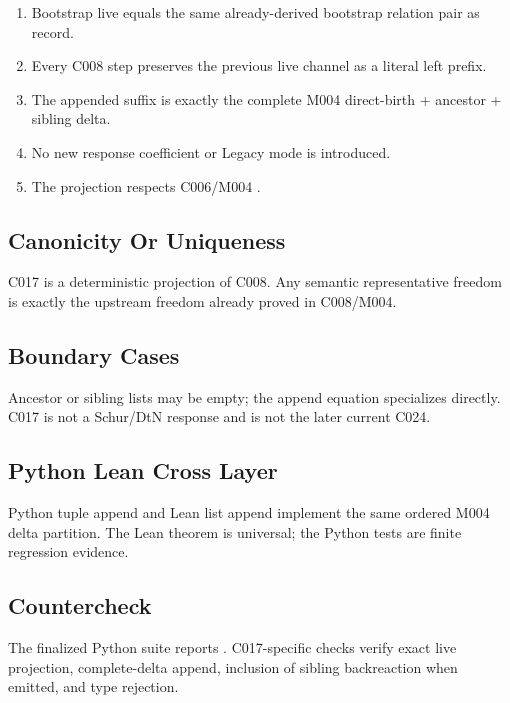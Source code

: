\begin{enumerate}
\def\labelenumi{\arabic{enumi}.}
\tightlist
\item
  Bootstrap live equals the same already-derived bootstrap relation pair
  as record.
\item
  Every C008 step preserves the previous live channel as a literal left
  prefix.
\item
  The appended suffix is exactly the complete M004 direct-birth +
  ancestor + sibling delta.
\item
  No new response coefficient or Legacy mode is introduced.
\item
  The projection respects C006/M004 \texttt{\protect{}}.
\end{enumerate}

\subsection{Canonicity Or Uniqueness}\label{canonicity-or-uniqueness-12}

C017 is a deterministic projection of C008. Any semantic representative
freedom is exactly the upstream \texttt{\protect{}} freedom already
proved in C008/M004.

\subsection{Boundary Cases}\label{boundary-cases-12}

Ancestor or sibling lists may be empty; the append equation specializes
directly. C017 is not a Schur/DtN response and is not the later
\texttt{\protect{}} current C024.

\subsection{Python Lean Cross Layer}\label{python-lean-cross-layer-12}

Python tuple append and Lean list append implement the same ordered M004
delta partition. The Lean theorem is universal; the Python tests are
finite regression evidence.

\subsection{Countercheck}\label{countercheck-12}

The finalized Python suite reports
\texttt{\protect{}}. C017-specific checks verify
exact live projection, complete-delta append, inclusion of sibling
backreaction when emitted, and type rejection.

